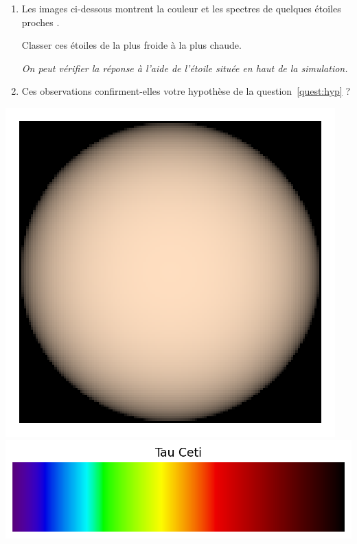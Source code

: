 \documentclass[12pt,a4paper]{article}
\begin{document}
\begin{enumerate}[resume]
\item \anarai{}

Les images ci-dessous montrent la couleur et les spectres de quelques étoiles \og proches \fg{}.

Classer ces étoiles de la plus froide à la plus chaude.

\textit{On peut vérifier la réponse à l'aide de l'étoile située en haut de la simulation.} \thumbsup

\item \val{}

Ces observations confirment-elles votre hypothèse de la question~\ref{quest:hyp} ?
\end{enumerate}

\newpage
\begin{center}
\newcommand{\localheight}{75 pt}
\includegraphics[height=\localheight]{images/star_tau_ceti.png}
\includegraphics[height=\localheight]{images/spectrum_star_tau_ceti.png}


\end{center}
\end{document}
